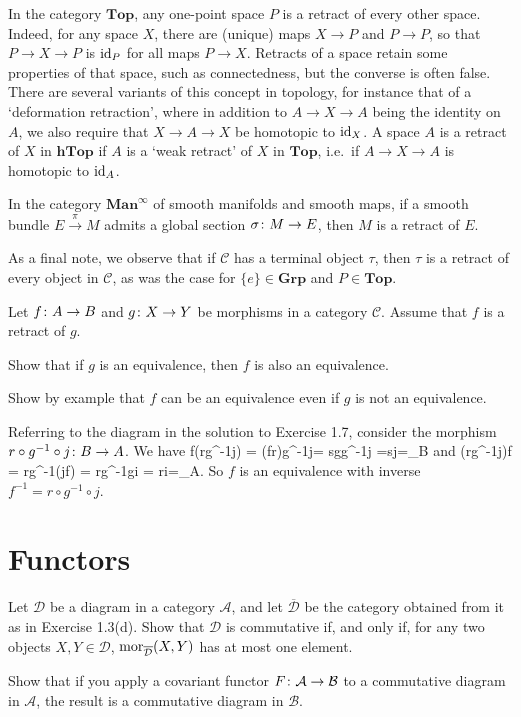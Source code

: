 In the category $\mathbf{Top}$, any one-point space $P$ is a retract of every other space. Indeed, for any space $X$, there are (unique) maps $X\to P$ and $P\to P$, so that $P\to X\to P$ is $\mathrm{id}_P$ for all maps $P\to X$. Retracts of a space retain some properties of that space, such as connectedness, but the converse is often false. There are several variants of this concept in topology, for instance that of a `deformation retraction', where in addition to $A\to X\to A$ being the identity on $A$, we also require that $X\to A\to X$ be homotopic to $\mathrm{id}_X$. A space $A$ is a retract of $X$ in $\mathbf{hTop}$ if $A$ is a `weak retract' of $X$ in $\mathbf{Top}$, i.e.\ if $A\to X\to A$ is homotopic to $\mathrm{id}_A$. 

In the category $\mathbf{Man}^{\infty}$ of smooth manifolds and smooth maps, if a smooth bundle $E\xrightarrow{\,\pi\,}M$ admits a global section $\sigma\colon M\to E$, then $M$ is a retract of $E$.

As a final note, we observe that if $\mathcal{C}$ has a terminal object $\tau$, then $\tau$ is a retract of every object in $\mathcal{C}$, as was the case for $\{e\}\in\mathbf{Grp}$ and $P\in\mathbf{Top}$.
\es

\bp
Let $f \colon A \to B$ and $g \colon X \to Y$ be morphisms in a category $\mathcal{C}$. Assume that $f$ is a retract of $g$.
\ben[label=(\alph*)]
\item Show that if $g$ is an equivalence, then $f$ is also an equivalence.
\item Show by example that $f$ can be an equivalence even if $g$ is not an equivalence.
\een
\ep

\bs
\ben[label=(\alph*)]
\item Referring to the diagram in the solution to Exercise 1.7, consider the morphism $r\circ g^{-1}\circ j\colon B\to A$. We have
\bse
f\circ (r\circ g^{-1}\circ j) = (f\circ r)\circ g^{-1}\circ j= s\circ g\circ g^{-1}\circ j =s\circ j=\id_B
\ese
and
\bse
(r\circ g^{-1}\circ j)\circ f = r\circ g^{-1}\circ (j\circ f) = r\circ g^{-1}\circ g\circ i = r\circ i=\id_A.
\ese
So $f$ is an equivalence with inverse $f^{-1}=r\circ g^{-1}\circ j$.
\item
\een
\es

\section{Functors}

\bx
\ben[label=(\alph*)]
\item  Let $\mathcal{D}$ be a diagram in a category $\mathcal{A}$, and let $\overline{\mathcal{D}}$ be the category obtained
from it as in Exercise 1.3(d). Show that $\mathcal{D}$ is commutative if, and only if, for any two objects $X, Y \in \mathcal{D}$, $\operatorname{mor}_{\overline{\mathcal{D}}}(X, Y )$ has at most one element.
\item Show that if you apply a covariant functor $F \colon \mathcal{A} \to \mathcal{B}$ to a commutative diagram in $\mathcal{A}$, the result is a commutative diagram in $\mathcal{B}$.
\een
\ex

